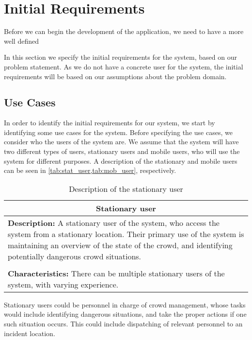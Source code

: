 \section{Initial Requirements}\label{sec:s1_requirements}
Before we can begin the development of the application, we need to have a more well defined  

In this section we specify the initial requirements for the system, based on our problem statement. As we do not have a concrete user for the system, the initial requirements will be based on our assumptions about the problem domain. 

\subsection{Use Cases}
In order to identify the initial requirements for our system, we start by identifying some use cases for the system. Before specifying the use cases, we consider who the users of the system are. We assume that the system will have two different types of users, stationary users and mobile users, who will use the system for different purposes. A description of the stationary and mobile users can be seen in \cref{tab:stat_user,tab:mob_user}, respectively.

\begin{table}[h!]
    \centering
    \begin{tabularx}{/8}{X}
        \toprule
        \multicolumn{1}{c}{\textbf{Stationary user}} \\ 
        \midrule
        \textbf{Description:} A stationary user of the system, who access the system from a stationary location. Their primary use of the system is maintaining an overview of the state of the crowd, and identifying potentially dangerous crowd situations. \\
        \\
        \textbf{Characteristics:} There can be multiple stationary users of the system, with varying experience. \\
        \bottomrule
    \end{tabularx}
    \caption{Description of the stationary user}
    \label{tab:stat_user}
\end{table}

Stationary users could be personnel in charge of crowd management, whose tasks would include identifying dangerous situations, and take the proper actions if one such situation occurs. This could include dispatching of relevant personnel to an incident location.


